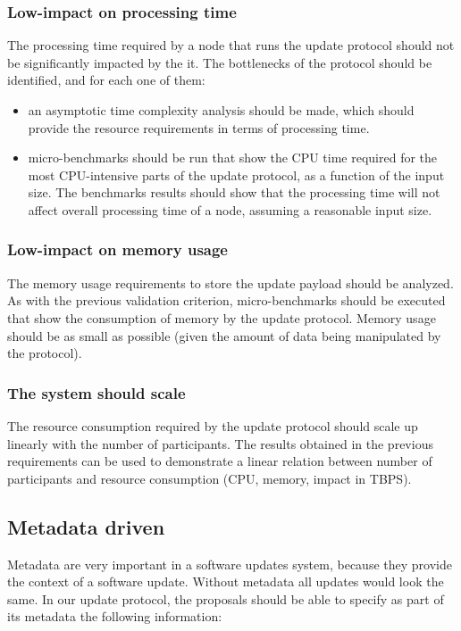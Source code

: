 \subsubsection{Low-impact on processing
	time}\label{vc:Low-impact_on_processing_time}
The processing time required by a node that runs the update protocol should not
be significantly impacted by the it. The bottlenecks of the protocol should be
identified, and for each one of them:
\begin{itemize}
	\item an asymptotic time complexity analysis should be made, which should
	provide	the resource requirements in terms of processing time.
	\item micro-benchmarks should be run that show the CPU time required for
	the most CPU-intensive parts of the update protocol, as a
	function of
	the input size. The benchmarks results should show that the processing time
	will not affect overall processing time of a node, assuming a reasonable
	input size.
	
\end{itemize}

\subsubsection{Low-impact on memory usage}\label{vc:Low-impact_on_memory_usage}
The memory usage requirements to store the update payload should be analyzed.
As with the previous validation criterion, micro-benchmarks should be executed
that show the consumption of memory by the update protocol. Memory usage should
be as small as possible (given the amount of data being manipulated by the
protocol).

\subsubsection{The system should scale}\label{vc:The_system_should_scale}
The resource consumption required by the update protocol should scale up
linearly with the number of participants. The results obtained in the previous
requirements can be used to demonstrate a linear relation between number of
participants and resource consumption (CPU, memory, impact in TBPS).

\subsection{Metadata driven}\label{sec:metadata_driven}
Metadata are very important in a software updates system, because they
provide the context of a software update. Without metadata all updates would
look the same. In our update protocol, the proposals should be able to specify
as part of its metadata the following information:


